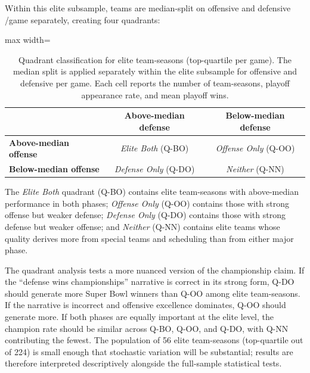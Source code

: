 Within this elite subsample, teams are median-split on offensive and defensive
\xvoa{}/game separately, creating four quadrants:

\begin{table}[htbp]
  \centering
  \caption[Quadrant classification for elite team-seasons]{Quadrant classification for elite team-seasons (top-quartile
           \gds{} per game). The median split is applied separately within
           the elite subsample for offensive and defensive \xvoa{} per game.
           Each cell reports the number of team-seasons, playoff appearance
           rate, and mean playoff wins.}
  \label{tab:quadrants}
  \begin{adjustbox}{max width=\textwidth}
  \begin{tabular}{lcc}
    \toprule
    & \textbf{Above-median defense} & \textbf{Below-median defense} \\
    \midrule
    \textbf{Above-median offense}
      & \textit{Elite Both} (Q-BO)
      & \textit{Offense Only} (Q-OO) \\[4pt]
    \textbf{Below-median offense}
      & \textit{Defense Only} (Q-DO)
      & \textit{Neither} (Q-NN) \\
    \bottomrule
  \end{tabular}
  \end{adjustbox}
\end{table}

The \textit{Elite Both} quadrant (Q-BO) contains elite team-seasons with
above-median performance in both phases; \textit{Offense Only} (Q-OO) contains
those with strong offense but weaker defense; \textit{Defense Only} (Q-DO)
contains those with strong defense but weaker offense; and \textit{Neither}
(Q-NN) contains elite teams whose quality derives more from special teams and
scheduling than from either major phase.

The quadrant analysis tests a more nuanced version of the championship claim.
If the ``defense wins championships'' narrative is correct in its strong form,
Q-DO should generate more Super Bowl winners than Q-OO among elite team-seasons.
If the narrative is incorrect and offensive excellence dominates, Q-OO should
generate more. If both phases are equally important at the elite level, the
champion rate should be similar across Q-BO, Q-OO, and Q-DO, with Q-NN
contributing the fewest. The population of 56 elite team-seasons (top-quartile
out of 224) is small enough that stochastic variation will be substantial;
results are therefore interpreted descriptively alongside the full-sample
statistical tests.

